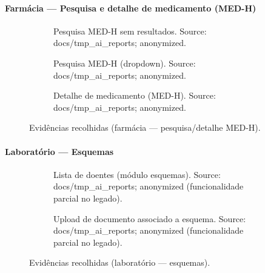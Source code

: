 \paragraph{Farmácia — Pesquisa e detalhe de medicamento (MED-H)}
\begin{figure}[htbp]
    \centering
    \begin{subfigure}[t]{0.48\textwidth}
        \centering
        \caption{Pesquisa MED-H sem resultados. Source: docs/tmp\_ai\_reports; anonymized.}
        \label{fig:baseline_medh_search_empty_v1}
    \end{subfigure}\hfill
    \begin{subfigure}[t]{0.48\textwidth}
        \centering
        \caption{Pesquisa MED-H (dropdown). Source: docs/tmp\_ai\_reports; anonymized.}
        \label{fig:baseline_medh_search_dropdown_v1}
    \end{subfigure}
    \begin{subfigure}[t]{0.48\textwidth}
        \centering
        \caption{Detalhe de medicamento (MED-H). Source: docs/tmp\_ai\_reports; anonymized.}
        \label{fig:baseline_medh_drug_detail_v1}
    \end{subfigure}
    \caption{Evidências recolhidas (farmácia — pesquisa/detalhe MED-H).}
\end{figure}

\paragraph{Laboratório — Esquemas}
\begin{figure}[htbp]
    \centering
    \begin{subfigure}[t]{0.48\textwidth}
        \centering
        \caption{Lista de doentes (módulo esquemas). Source: docs/tmp\_ai\_reports; anonymized (funcionalidade parcial no legado).}
        \label{fig:lab_esquemas_lista_doentes}
    \end{subfigure}\hfill
    \begin{subfigure}[t]{0.48\textwidth}
        \centering
        \caption{Upload de documento associado a esquema. Source: docs/tmp\_ai\_reports; anonymized (funcionalidade parcial no legado).}
        \label{fig:lab_esquemas_upload}
    \end{subfigure}
    \caption{Evidências recolhidas (laboratório — esquemas).}
\end{figure}

